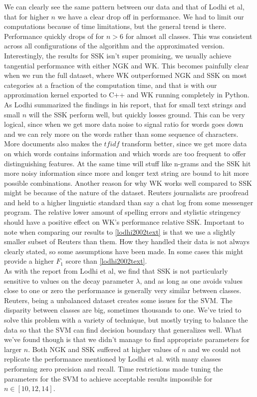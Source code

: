 We can clearly see the same pattern between our data and that of Lodhi et al, that for higher $ n $ we have a clear drop off in performance. We had to limit our computations because of time limitations, but the general trend is there. Performance quickly drops of for $ n > 6 $ for almost all classes. This was consistent across all configurations of the algorithm and the approximated version. Interestingly, the results for SSK isn't super promising, we usually achieve tangential performance with either NGK and WK. This becomes painfully clear when we run the full dataset, where WK outperformed NGK and SSK on most categories at a fraction of the computation time, and that is with our approximation kernel exported to C++ and WK running completely in Python. As Lodhi summarized the findings in his report, that for small text strings and small $ n $ will the SSK perform well, but quickly losses ground. This can be very logical, since when we get more data noise to signal ratio for words goes down and we can rely more on the words rather than some sequence of characters. More documents also makes the $ tfidf $ transform better, since we get more data on which words contains information and which words are too frequent to offer distinguishing features. At the same time will stuff like n-grams and the SSK hit more noisy information since more and longer text string are bound to hit more possible combinations. Another reason for why WK works well compared to SSK might be because of the nature of the dataset. Reuters journalists are proofread and held to a higher linguistic standard than say a chat log from some messenger program. The relative lower amount of spelling errors and stylistic stringency should have a positive effect on WK's performance relative SSK. Important to note when comparing our results to \ref{lodhi2002text} is that we use a slightly smaller subset of Reuters than them. How they handled their data is not always clearly stated, so some assumptions have been made. In some cases this might provide a higher $ F_1 $ score than \ref{lodhi2002text}.
\\
As with the report from Lodhi et al, we find that SSK is not particularly sensitive to values on the decay parameter $ \lambda $, and as long as one avoids values close to one or zero the performance is generally very similar between classes. Reuters, being a unbalanced dataset creates some issues for the SVM. The disparity between classes are big, sometimes thousands to one. We've tried to solve this problem with a variety of technique, but mostly trying to balance the data so that the SVM can find decision boundary that generalizes well. What we've found though is that we didn't manage to find appropriate parameters for larger $ n $. Both NGK and SSK suffered at higher values of $ n $ and we could not replicate the performance mentioned by Lodhi et al. with many classes performing zero precision and recall. Time restrictions made tuning the parameters for the SVM to achieve acceptable results impossible for $ n \in [10,12,14] $. 
